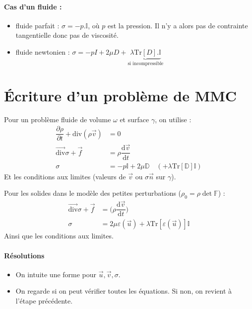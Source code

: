 \documentclass{article}
\newcommand{\deriv}{\mathrm{d}}
\begin{document}
\paragraph{Cas d'un fluide :}
\begin{itemize}
\item fluide parfait : $\sigma = -p . \mathbb{I}$, où $p$ est la pression. Il n'y a alors pas de contrainte tangentielle donc pas de viscosité.
\item fluide newtonien : $\sigma = -pI + 2 \mu D + \underbrace{\lambda \text{Tr}[D].\mathbb{I}}_{\text{si incompressible}}$
\end{itemize}

\section{Écriture d'un problème de MMC}
Pour un problème fluide de volume $\omega$ et surface $\gamma$, on utilise :
\begin{align*}
\dfrac{\partial \rho}{\partial t} + \text{div}(\rho \vec{v}) & = 0\\
\overrightarrow{\text{div}}\sigma + \vec{f} & = \rho\dfrac{\deriv \vec{v}}{\deriv t}\\
\sigma & = -p\mathbb{I} + 2 \mu \mathbb{D} \quad ( + \lambda \text{Tr}[\mathbb{D}] \mathbb{I})
\end{align*}
Et les conditions aux limites (valeurs de $\vec{v}$ ou $\sigma \vec{n}$ sur $\gamma$).
\bigskip

Pour les solides dans le modèle des petites perturbations ($\rho_0 = \rho \det \mathbb{F}$) :
\begin{align*}
\overrightarrow{\text{div}} \sigma + \vec{f} & = \Big(\rho \dfrac{\deriv \vec{v}}{\deriv t} \Big)\\
\sigma & = 2\mu\varepsilon (\vec{u}) + \lambda \text{Tr}[\varepsilon(\vec{u})]\mathbb{I}
\end{align*}
Ainsi que les conditions aux limites.

\paragraph{Résolutions}
\begin{itemize}[label=$\star$]
\item On intuite une forme pour $\vec{u}, \vec{v}, \sigma$.
\item On regarde si on peut vérifier toutes les équations. Si non, on revient à l'étape précédente. 
\end{itemize}
\end{document}
